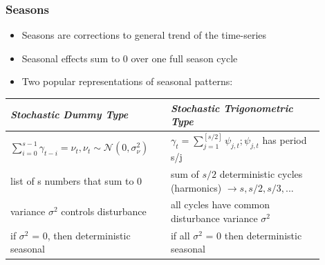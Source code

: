 \documentclass{beamer}
\begin{document}
\begin{frame}[t]\frametitle{Seasons}
\begin{itemize}
\item Seasons are corrections to general trend of the time-series
\item Seasonal effects sum to 0 over one full season cycle
\item Two popular representations of seasonal patterns:
\end{itemize}
\begin{table}
\centering
\begin{tabular}{||p{0.45\linewidth} | p{0.45\linewidth}||}
 \hline
 \textit{Stochastic Dummy Type} &  \textit{Stochastic Trigonometric Type} \\ [0.5ex] 
 \hline\hline
 $\sum_{i=0}^{s-1} \gamma_{t-i} = \nu_{t}, \nu_{t} \sim \mathcal{N}(0,\sigma^{2}_{\nu})$ & $\gamma_{t} = \sum_{j=1}^{[s/2]} \psi_{j,t}; \psi_{j,t}$ has period s/j \\ 
 \hline
 list of s numbers that sum to 0 & sum of $s/2$ deterministic cycles (harmonics) $\rightarrow s, s/2, s/3, ...$  \\
 \hline
 variance $\sigma^{2}$ controls disturbance & all cycles have common disturbance variance $\sigma^{2}$ \\
 \hline
 if $\sigma^{2}$ = 0, then deterministic seasonal & if all $\sigma^{2}$ = 0 then deterministic seasonal\\
 \hline
\end{tabular}
\end{table}
\end{frame}
\end{document}
